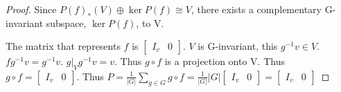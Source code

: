 \documentclass{article}
\begin{document}
\begin{proof}
    Since $P(f)_*(V) \oplus \ker P(f) \cong V$, there exists a complementary G-invariant subspace, $\ker P(f)$, to V.

    The matrix that represents $f$ is $\begin{bmatrix}
        I_v & 0
    \end{bmatrix}$. $V$ is G-invariant, this $g^{-1}v \in V$. $fg^{-1} v = g^{-1} v$. $g|_{V} g^{-1} v = v$. Thus $g \circ f$ is a projection onto V. Thus $g \circ f = \begin{bmatrix}
        I_v & 0
    \end{bmatrix}$. Thus $P = \frac{1}{|G|} \sum_{g \in G} g \circ f = \frac{1}{|G|} |G|\begin{bmatrix}
        I_v & 0
    \end{bmatrix} = \begin{bmatrix}
        I_v & 0
    \end{bmatrix}$          
\end{proof}
\end{document}
